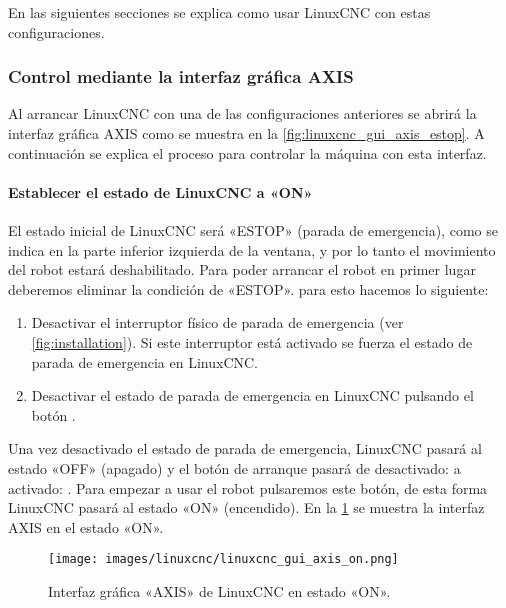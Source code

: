\documentclass[english,spanish,a4paper,11pt]{article}
\begin{document}
En las siguientes secciones se explica como usar LinuxCNC con estas configuraciones.


\subsubsection{Control mediante la interfaz gráfica AXIS}
\label{sec:linuxcnc_usage_gui_axis}

Al arrancar LinuxCNC con una de las configuraciones anteriores se abrirá la interfaz gráfica AXIS como se muestra en la \cref{fig:linuxcnc_gui_axis_estop}. A continuación se explica el proceso para controlar la máquina con esta interfaz.

\paragraph{Establecer el estado de LinuxCNC a «ON»}\hfill\medskip

El estado inicial de LinuxCNC será «ESTOP» (parada de emergencia), como se indica en la parte inferior izquierda de la ventana, y por lo tanto el movimiento del robot estará deshabilitado. Para poder arrancar el robot en primer lugar deberemos eliminar la condición de «ESTOP». para esto hacemos lo siguiente:
%
\begin{enumerate}
    \item Desactivar el interruptor físico de parada de emergencia (ver \cref{fig:installation}). Si este interruptor está activado se fuerza el estado de parada de emergencia en LinuxCNC.

    \item Desactivar el estado de parada de emergencia en LinuxCNC pulsando el botón .
\end{enumerate}

Una vez desactivado el estado de parada de emergencia, LinuxCNC pasará al estado «OFF» (apagado) y el botón de arranque pasará de desactivado:  a activado: . Para empezar a usar el robot pulsaremos este botón, de esta forma LinuxCNC pasará al estado «ON» (encendido). En la \cref{fig:linuxcnc_gui_axis_on} se muestra la interfaz AXIS en el estado «ON».

\begin{figure}[!ht]
    \centering
    \texttt{[image: images/linuxcnc/linuxcnc\_gui\_axis\_on.png]}
    \caption{Interfaz gráfica «AXIS» de LinuxCNC en estado «ON».}
    \label{fig:linuxcnc_gui_axis_on}
\end{figure}
\end{document}
